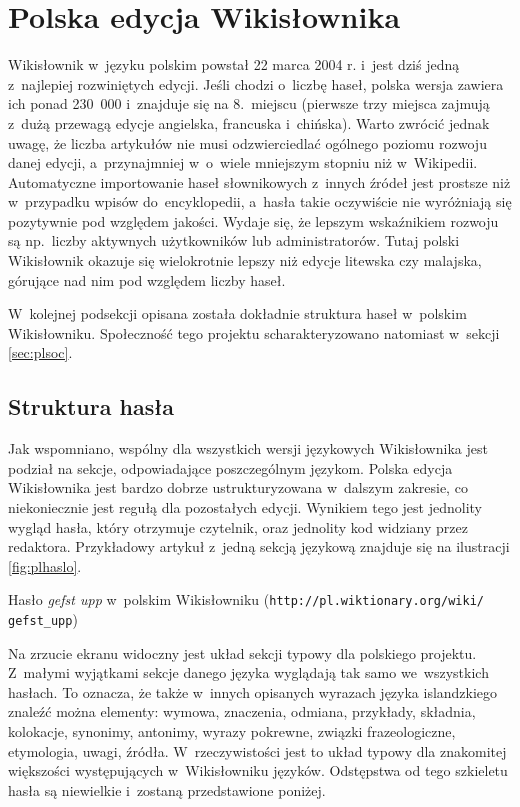 \documentclass{pracamgr}
\begin{document}
\section{Polska edycja Wikisłownika}
\label{sec:plwikt}
Wikisłownik w~języku polskim powstał 22 marca 2004 r. %
i~jest dziś jedną z~najlepiej rozwiniętych edycji. Jeśli chodzi o~liczbę haseł, polska wersja zawiera ich ponad 230~000 i~znajduje się na 8.~miejscu (pierwsze trzy miejsca zajmują z~dużą przewagą edycje angielska, francuska i~chińska). Warto zwrócić jednak uwagę, że liczba artykułów nie musi odzwierciedlać ogólnego poziomu rozwoju danej edycji, a~przynajmniej w~o~wiele mniejszym stopniu niż w~Wikipedii. Automatyczne importowanie haseł słownikowych z~innych źródeł jest prostsze niż w~przypadku wpisów do~encyklopedii, a~hasła takie oczywiście nie wyróżniają się pozytywnie pod względem jakości. Wydaje się, że lepszym wskaźnikiem rozwoju są np.\ liczby aktywnych użytkowników lub administratorów. Tutaj polski Wikisłownik okazuje się wielokrotnie lepszy niż edycje litewska czy malajska, górujące nad nim pod względem liczby haseł.

W~kolejnej podsekcji opisana została dokładnie struktura haseł w~polskim Wikisłowniku. Społeczność tego projektu scharakteryzowano natomiast w~sekcji \ref{sec:plsoc}.

\subsection{Struktura hasła}
Jak wspomniano, wspólny dla wszystkich wersji językowych Wikisłownika jest podział na sekcje, odpowiadające poszczególnym językom. Polska edycja Wikisłownika jest bardzo dobrze ustrukturyzowana w~dalszym zakresie, co niekoniecznie jest regułą dla pozostałych edycji. Wynikiem tego jest jednolity wygląd hasła, który otrzymuje czytelnik, oraz jednolity kod widziany przez redaktora. Przykładowy artykuł z~jedną sekcją językową znajduje się na ilustracji \ref{fig:plhaslo}.

\begin{illustration}
	\caption{Hasło \emph{gefst upp} w~polskim Wikisłowniku (\texttt{http://pl.wiktionary.org/wiki/ gefst\_upp})}
	\label{fig:plhaslo}
\end{illustration}

Na zrzucie ekranu widoczny jest układ sekcji typowy dla polskiego projektu. Z~małymi wyjątkami sekcje danego języka wyglądają tak samo we~wszystkich hasłach. To oznacza, że także w~innych opisanych wyrazach języka islandzkiego znaleźć można elementy: wymowa, znaczenia, odmiana, przykłady, składnia, kolokacje, synonimy, antonimy, wyrazy pokrewne, związki frazeologiczne, etymologia, uwagi, źródła. W~rzeczywistości jest to układ typowy dla znakomitej większości występujących w~Wikisłowniku języków. Odstępstwa od tego szkieletu hasła są niewielkie i~zostaną przedstawione poniżej.
\end{document}
